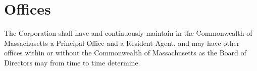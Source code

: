 \chapter{Offices}

The Corporation shall have and continuously maintain in the Commonwealth of Massachusetts a Principal Office and a Resident Agent, and may have other offices within or without the Commonwealth of Massachusetts as the Board of Directors may from time to time determine.
